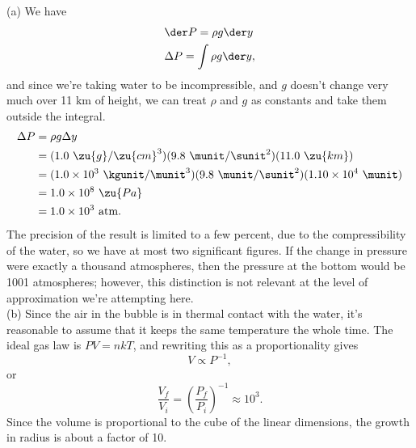 (a) We have 
\begin{align*}
  & \der P = \rho g \der y \\
  & \Delta P = \int \rho g \der y,
\end{align*}
and since we're taking water to be incompressible, and $g$ doesn't change very much over 11 km of
height, we can treat $\rho$ and $g$ as constants and take them outside the integral.
\begin{align*}
  \Delta P &= \rho g \Delta y \\
           &= (1.0\ \zu{g}/\zu{cm}^3)(9.8\ \munit/\sunit^2)(11.0\ \zu{km}) \\
           &= (1.0\times10^3\ \kgunit/\munit^3)(9.8\ \munit/\sunit^2)(1.10\times10^4\ \munit) \\
           &= 1.0\times10^8\ \zu{Pa} \\
           &= 1.0\times10^3\ \text{atm}.
\end{align*}
The precision of the result is limited to a few percent, due to the compressibility of the water,
so we have at most two significant figures. If the change in pressure were exactly a thousand
atmospheres, then the pressure at the bottom would be 1001 atmospheres; however, this distinction is
not relevant at the level of approximation we're attempting here.\\
(b) Since the air in the bubble is in thermal contact with the water, it's reasonable to assume
that it keeps the same temperature the whole time. The ideal gas law is $PV=nkT$, and rewriting this
as a proportionality gives
\begin{equation*}
  V\propto P^{-1},
\end{equation*}
or
\begin{equation*}
  \frac{V_f}{V_i} = \left(\frac{P_f}{P_i}\right)^{-1} \approx 10^3.
\end{equation*}
Since the volume is proportional to the cube of the linear dimensions, the growth in
radius is about a factor of 10.
